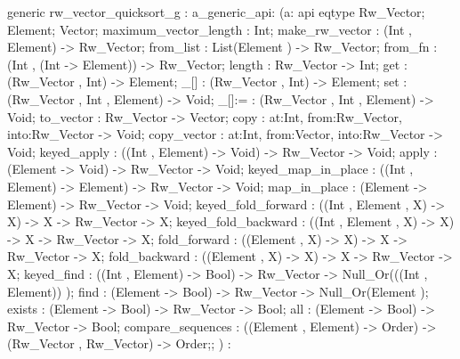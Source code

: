 generic rw_vector_quicksort_g
:
a_generic_api:
(a:
api {
    eqtype Rw_Vector;
    Element;
    Vector;
    maximum_vector_length : Int;
    make_rw_vector : (Int , Element) -> Rw_Vector;
    from_list : List(Element ) -> Rw_Vector;
    from_fn : (Int , (Int -> Element)) -> Rw_Vector;
    length : Rw_Vector -> Int;
    get : (Rw_Vector , Int) -> Element;
    _[] : (Rw_Vector , Int) -> Element;
    set : (Rw_Vector , Int , Element) -> Void;
    _[]:= : (Rw_Vector , Int , Element) -> Void;
    to_vector : Rw_Vector -> Vector;
    copy : {at:Int, from:Rw_Vector, into:Rw_Vector} -> Void;
    copy_vector : {at:Int, from:Vector, into:Rw_Vector} -> Void;
    keyed_apply : ((Int , Element) -> Void) -> Rw_Vector -> Void;
    apply : (Element -> Void) -> Rw_Vector -> Void;
    keyed_map_in_place : ((Int , Element) -> Element) -> Rw_Vector -> Void;
    map_in_place : (Element -> Element) -> Rw_Vector -> Void;
    keyed_fold_forward : ((Int , Element , X) -> X) -> X -> Rw_Vector -> X;
    keyed_fold_backward : ((Int , Element , X) -> X) -> X -> Rw_Vector -> X;
    fold_forward : ((Element , X) -> X) -> X -> Rw_Vector -> X;
    fold_backward : ((Element , X) -> X) -> X -> Rw_Vector -> X;
    keyed_find : ((Int , Element) -> Bool) -> Rw_Vector -> Null_Or(((Int , Element)) );
    find : (Element -> Bool) -> Rw_Vector -> Null_Or(Element );
    exists : (Element -> Bool) -> Rw_Vector -> Bool;
    all : (Element -> Bool) -> Rw_Vector -> Bool;
    compare_sequences : ((Element , Element) -> Order) -> (Rw_Vector , Rw_Vector) -> Order;};
)
:
